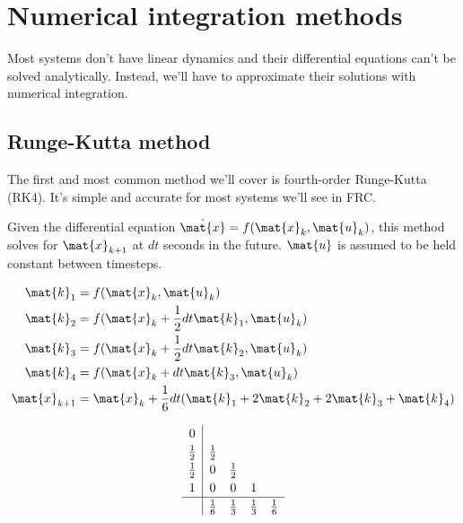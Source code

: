 \section{Numerical integration methods}

Most systems don't have linear dynamics and their differential equations can't
be solved analytically. Instead, we'll have to approximate their solutions with
numerical integration.

\subsection{Runge-Kutta method}

The first and most common method we'll cover is fourth-order Runge-Kutta (RK4).
It's simple and accurate for most systems we'll see in FRC.
\begin{theorem}
  \label{thm:rk4}

  Given the differential equation $\dot{\mat{x}} = f(\mat{x}_k, \mat{u}_k)$,
  this method solves for $\mat{x}_{k+1}$ at $dt$ seconds in the future.
  $\mat{u}$ is assumed to be held constant between timesteps.
  \begin{center}
    \begin{minipage}{0.35\linewidth}
      \centering
      \begin{align*}
        \mat{k}_1 &= f(\mat{x}_k, \mat{u}_k) \\
        \mat{k}_2 &= f(\mat{x}_k + \frac{1}{2} dt \mat{k}_1, \mat{u}_k) \\
        \mat{k}_3 &= f(\mat{x}_k + \frac{1}{2} dt \mat{k}_2, \mat{u}_k) \\
        \mat{k}_4 &= f(\mat{x}_k + dt \mat{k}_3, \mat{u}_k) \\
        \mat{x}_{k+1} &= \mat{x}_k + \frac{1}{6} dt (\mat{k}_1 + 2\mat{k}_2 +
          2\mat{k}_3 + \mat{k}_4)
      \end{align*}
    \end{minipage}
    \quad
    \begin{minipage}{0.35\linewidth}
      \centering
      \begin{equation*}
        \renewcommand\arraystretch{1.2}
        \begin{array}{c|cccc}
          0 \\
          \frac{1}{2} & \frac{1}{2} \\
          \frac{1}{2} & 0 & \frac{1}{2} \\
          1 & 0 & 0 & 1 \\
          \hline
          & \frac{1}{6} & \frac{1}{3} & \frac{1}{3} & \frac{1}{6}
        \end{array}
      \end{equation*}
    \end{minipage}
  \end{center}
\end{theorem}

